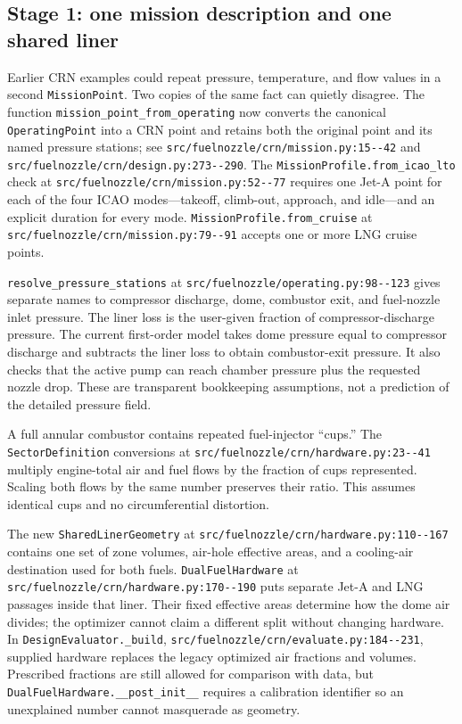 \documentclass[11pt]{article}
\newcommand{\code}[1]{\nolinkurl{#1}}
\newcommand{\srcline}[2]{\nolinkurl{#1:#2}}
\begin{document}
\subsection{Stage 1: one mission description and one shared liner}

Earlier CRN examples could repeat pressure, temperature, and flow values in a second
\code{MissionPoint}. Two copies of the same fact can quietly disagree. The function
\code{mission_point_from_operating} now converts the canonical \code{OperatingPoint} into a
CRN point and retains both the original point and its named pressure stations; see
\srcline{src/fuelnozzle/crn/mission.py}{15--42} and
\srcline{src/fuelnozzle/crn/design.py}{273--290}. The
\code{MissionProfile.from_icao_lto} check at
\srcline{src/fuelnozzle/crn/mission.py}{52--77} requires one Jet-A point for each of the four
ICAO modes---takeoff, climb-out, approach, and idle---and an explicit duration for every mode.
\code{MissionProfile.from_cruise} at
\srcline{src/fuelnozzle/crn/mission.py}{79--91} accepts one or more LNG cruise points.

\code{resolve_pressure_stations} at
\srcline{src/fuelnozzle/operating.py}{98--123} gives separate names to compressor discharge,
dome, combustor exit, and fuel-nozzle inlet pressure. The liner loss is the user-given
fraction of compressor-discharge pressure. The current first-order model takes dome pressure
equal to compressor discharge and subtracts the liner loss to obtain combustor-exit pressure.
It also checks that the active pump can reach chamber pressure plus the requested nozzle
drop. These are transparent bookkeeping assumptions, not a prediction of the detailed
pressure field.

A full annular combustor contains repeated fuel-injector ``cups.'' The
\code{SectorDefinition} conversions at
\srcline{src/fuelnozzle/crn/hardware.py}{23--41} multiply engine-total air and fuel flows by
the fraction of cups represented. Scaling both flows by the same number preserves their
ratio. This assumes identical cups and no circumferential distortion.

The new \code{SharedLinerGeometry} at
\srcline{src/fuelnozzle/crn/hardware.py}{110--167} contains one set of zone volumes, air-hole
effective areas, and a cooling-air destination used for both fuels.
\code{DualFuelHardware} at
\srcline{src/fuelnozzle/crn/hardware.py}{170--190} puts separate Jet-A and LNG passages inside
that liner. Their fixed effective areas determine how the dome air divides; the optimizer
cannot claim a different split without changing hardware. In
\code{DesignEvaluator.\_build}, \srcline{src/fuelnozzle/crn/evaluate.py}{184--231}, supplied
hardware replaces the legacy optimized air fractions and volumes. Prescribed fractions are
still allowed for comparison with data, but \code{DualFuelHardware.\_\_post\_init\_\_}
requires a calibration identifier so an unexplained number cannot masquerade as geometry.
\end{document}
